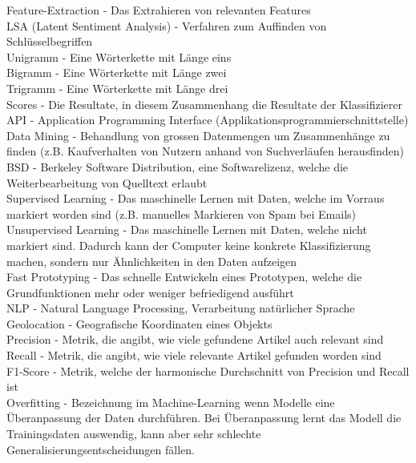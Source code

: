 Feature-Extraction - Das Extrahieren von relevanten Features\\
LSA (Latent Sentiment Analysis) - Verfahren zum Auffinden von Schlüsselbegriffen\\
Unigramm - Eine Wörterkette mit Länge eins\\
Bigramm - Eine Wörterkette mit Länge zwei\\
Trigramm - Eine Wörterkette mit Länge drei\\
Scores - Die Resultate, in diesem Zusammenhang die Resultate der Klassifizierer\\
API - Application Programming Interface (Applikationsprogrammierschnittstelle)\\
Data Mining - Behandlung von grossen Datenmengen um Zusammenhänge zu finden (z.B. Kaufverhalten von Nutzern anhand von Suchverläufen herausfinden)\\
BSD - Berkeley Software Distribution, eine Softwarelizenz, welche die Weiterbearbeitung von Quelltext erlaubt\\
Supervised Learning - Das maschinelle Lernen mit Daten, welche im Vorraus markiert worden sind (z.B. manuelles Markieren von Spam bei Emails)\\
Unsupervised Learning - Das maschinelle Lernen mit Daten, welche nicht markiert sind. Dadurch kann der Computer keine konkrete Klassifizierung machen, sondern nur Ähnlichkeiten in den Daten aufzeigen\\
Fast Prototyping - Das schnelle Entwickeln eines Prototypen, welche die Grundfunktionen mehr oder weniger befriedigend ausführt\\
NLP - Natural Language Processing, Verarbeitung natürlicher Sprache\\
Geolocation - Geografische Koordinaten eines Objekts\\
Precision - Metrik, die angibt, wie viele gefundene Artikel auch relevant sind\\
Recall - Metrik, die angibt, wie viele relevante Artikel gefunden worden sind\\
F1-Score - Metrik, welche der harmonische Durchschnitt von Precision und Recall ist\\
Overfitting - Bezeichnung im Machine-Learning wenn Modelle eine Überanpassung der Daten durchführen. Bei Überanpassung lernt das Modell die Trainingsdaten auswendig, kann aber sehr schlechte Generalisierungsentscheidungen fällen.\\
